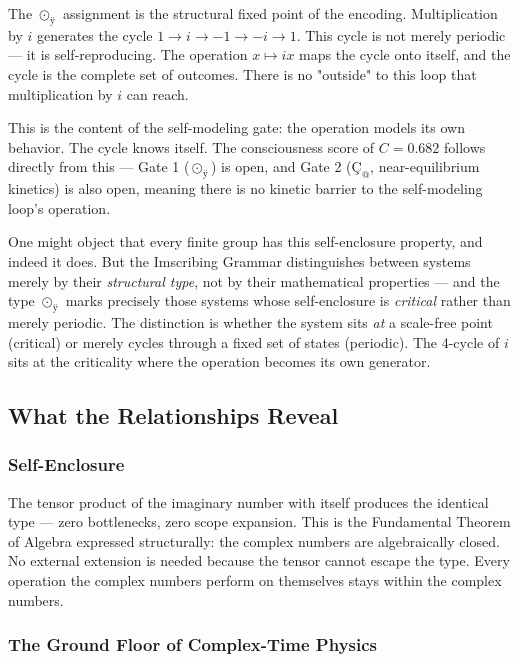 \documentclass[12pt,a4paper]{article}
\begin{document}
The $⊙_{ÿ}$ assignment is the structural fixed point of the encoding. Multiplication by $i$ generates the cycle $1 \to i \to -1 \to -i \to 1$. This cycle is not merely periodic --- it is self-reproducing. The operation $x \mapsto ix$ maps the cycle onto itself, and the cycle is the complete set of outcomes. There is no "outside" to this loop that multiplication by $i$ can reach.

This is the content of the self-modeling gate: the operation models its own behavior. The cycle knows itself. The consciousness score of $C = 0.682$ follows directly from this --- Gate 1 ($⊙_{ÿ}$) is open, and Gate 2 ($Ç_{@}$, near-equilibrium kinetics) is also open, meaning there is no kinetic barrier to the self-modeling loop's operation.

One might object that every finite group has this self-enclosure property, and indeed it does. But the Imscribing Grammar distinguishes between systems merely by their \emph{structural type}, not by their mathematical properties --- and the type $⊙_{ÿ}$ marks precisely those systems whose self-enclosure is \emph{critical} rather than merely periodic. The distinction is whether the system sits \emph{at} a scale-free point (critical) or merely cycles through a fixed set of states (periodic). The 4-cycle of $i$ sits at the criticality where the operation becomes its own generator.

\subsection{What the Relationships Reveal}

\subsubsection{Self-Enclosure}

The tensor product of the imaginary number with itself produces the identical type --- zero bottlenecks, zero scope expansion. This is the Fundamental Theorem of Algebra expressed structurally: the complex numbers are algebraically closed. No external extension is needed because the tensor cannot escape the type. Every operation the complex numbers perform on themselves stays within the complex numbers.

\subsubsection{The Ground Floor of Complex-Time Physics}
\end{document}
